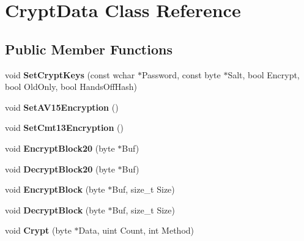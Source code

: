 \hypertarget{class_crypt_data}{\section{Crypt\-Data Class Reference}
\label{class_crypt_data}
}
\subsection*{Public Member Functions}
\begin{DoxyCompactItemize}
\item 
\hypertarget{class_crypt_data_ad966dfc927aeeb20c6f2d7282bb49c55}{void {\bfseries Set\-Crypt\-Keys} (const wchar $\ast$Password, const byte $\ast$Salt, bool Encrypt, bool Old\-Only, bool Hands\-Off\-Hash)}\label{class_crypt_data_ad966dfc927aeeb20c6f2d7282bb49c55}

\item 
\hypertarget{class_crypt_data_acea183e5b27efea3dfcc6fe0a1f8c71b}{void {\bfseries Set\-A\-V15\-Encryption} ()}\label{class_crypt_data_acea183e5b27efea3dfcc6fe0a1f8c71b}

\item 
\hypertarget{class_crypt_data_a86c0d7a539a508a4d9dd5cbeb5a22c09}{void {\bfseries Set\-Cmt13\-Encryption} ()}\label{class_crypt_data_a86c0d7a539a508a4d9dd5cbeb5a22c09}

\item 
\hypertarget{class_crypt_data_a04331297a6175bba2b0115b0b5db948d}{void {\bfseries Encrypt\-Block20} (byte $\ast$Buf)}\label{class_crypt_data_a04331297a6175bba2b0115b0b5db948d}

\item 
\hypertarget{class_crypt_data_adcb3af7e7771ef28856f1e0de5d449c2}{void {\bfseries Decrypt\-Block20} (byte $\ast$Buf)}\label{class_crypt_data_adcb3af7e7771ef28856f1e0de5d449c2}

\item 
\hypertarget{class_crypt_data_aa66eb131f5babe624563c7958c0d9d0c}{void {\bfseries Encrypt\-Block} (byte $\ast$Buf, size\-\_\-t Size)}\label{class_crypt_data_aa66eb131f5babe624563c7958c0d9d0c}

\item 
\hypertarget{class_crypt_data_adfd78aeb9b855fcfb8eeb77c99732771}{void {\bfseries Decrypt\-Block} (byte $\ast$Buf, size\-\_\-t Size)}\label{class_crypt_data_adfd78aeb9b855fcfb8eeb77c99732771}

\item 
\hypertarget{class_crypt_data_ab8fa43a011aaf809eb3193fa4295124b}{void {\bfseries Crypt} (byte $\ast$Data, uint Count, int Method)}\label{class_crypt_data_ab8fa43a011aaf809eb3193fa4295124b}

\end{DoxyCompactItemize}
